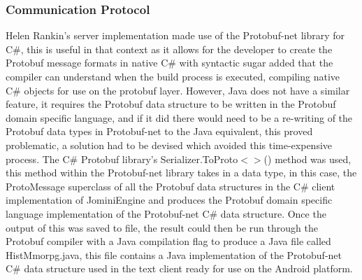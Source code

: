 \documentclass{article}
\begin{document}
\subsubsection{Communication Protocol}

Helen Rankin's\cite{helenrankin} server implementation made use of the Protobuf-net library for C\#, this is useful in that context as it allows for the developer to create the Protobuf message formats in native C\# with syntactic sugar added that the compiler can understand when the build process is executed, compiling native C\# objects for use on the protobuf layer. However, Java does not have a similar feature, it requires the Protobuf data structure to be written in the Protobuf domain specific language, and if it did there would need to be a re-writing of the Protobuf data types in Protobuf-net to the Java equivalent, this proved problematic, a solution had to be devised which avoided this time-expensive process. The C\# Protobuf library's Serializer.ToProto$<>$() method was used, this method within the Protobuf-net library takes in a data type, in this case, the ProtoMessage superclass of all the Protobuf data structures in the C\# client implementation of JominiEngine and produces the Protobuf domain specific language implementation of the Protobuf-net C\# data structure. Once the output of this was saved to file, the result could then be run through the Protobuf compiler with a Java compilation flag to produce a Java file called HistMmorpg.java, this file contains a Java implementation of the Protobuf-net C\# data structure used in the text client ready for use on the Android platform.
\end{document}
